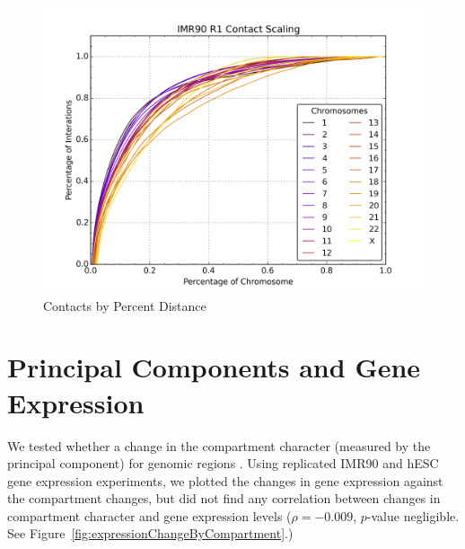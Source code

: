 \begin{figure}[thp]
  \begin{minipage}{0.45\textwidth}
    \centering
    \caption{Contacts by Percent Distance}\label{fig:probeScalesPercent}
    \includegraphics[width=\textwidth]{./figures/results/probeScalesPercent.png}
  \end{minipage}
\end{figure}


%

\section*{Principal Components and Gene Expression}

We tested whether a change in the compartment character (measured by the principal component) for genomic regions .  Using replicated
IMR90 and hESC gene expression experiments, we plotted the changes in gene expression against the compartment changes, but did not
find any correlation between changes in compartment character and gene expression levels ($\rho = -0.009$, $p$-value negligible.
See Figure~\ref{fig:expressionChangeByCompartment}.)

